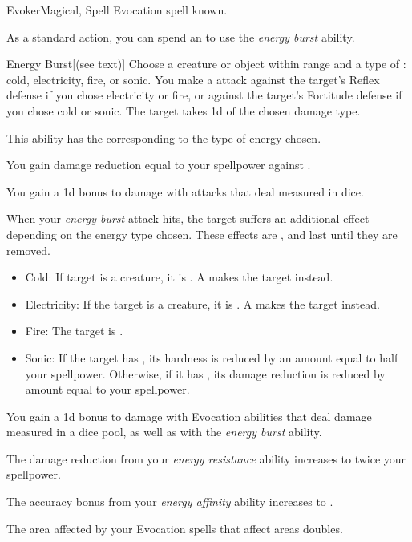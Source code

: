     \begin{feat}{Evoker}{Magical, Spell}
        \featpre Evocation spell known.

         As a standard action, you can spend an  to use the \textit{energy burst} ability.
        \begin{ability}{Energy Burst}[(see text)]
            Choose a creature or object within \rngclose range and a type of : cold, electricity, fire, or sonic.
            You make a  attack against the target's Reflex defense if you chose electricity or fire, or against the target's Fortitude defense if you chose cold or sonic.
            \hit The target takes  \plus1d of the chosen damage type.

            This ability has the  corresponding to the type of energy chosen.
        \end{ability}

         You gain damage reduction equal to your spellpower against .

         You gain a \plus1d bonus to damage with attacks that deal  measured in dice.

         When your \textit{energy burst} attack hits, the target suffers an additional effect depending on the energy type chosen.
        These effects are , and last until they are removed.
        \begin{itemize}
            \item Cold: If target is a creature, it is \fatigued.
                A  makes the target \exhausted instead.
            \item Electricity: If the target is a creature, it is \dazed.
                A  makes the target \stunned instead.
            \item Fire: The target is \ignited.
            \item Sonic: If the target has , its hardness is reduced by an amount equal to half your spellpower. Otherwise, if it has , its damage reduction is reduced by amount equal to your spellpower.
        \end{itemize}

         You gain a \plus1d bonus to damage with Evocation abilities that deal damage measured in a dice pool, as well as with the \textit{energy burst} ability.

         The damage reduction from your \textit{energy resistance} ability increases to twice your spellpower.

         The accuracy bonus from your \textit{energy affinity} ability increases to .

         The area affected by your Evocation spells that affect areas doubles.
    \end{feat}

